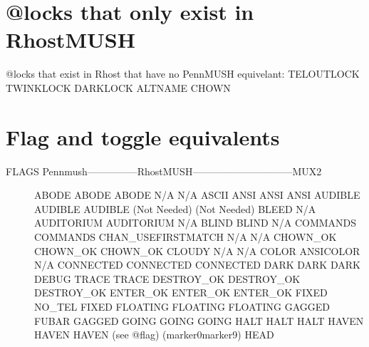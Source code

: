 \documentclass[letterpaper,10pt,english]{sphinxmanual}
\begin{document}
\section{@locks that only exist in RhostMUSH}
\label{\detokenize{31-comparison:locks-that-only-exist-in-rhostmush}}
\sphinxAtStartPar
@locks that exist in Rhost that have no PennMUSH equivelant:
TELOUTLOCK                   TWINKLOCK                     DARKLOCK
ALTNAME                      CHOWN


\section{Flag and toggle equivalents}
\label{\detokenize{31-comparison:flag-and-toggle-equivalents}}\begin{description}
\item[{FLAGS Pennmush—————\sphinxhyphen{}RhostMUSH——————————MUX2}] \leavevmode
\sphinxAtStartPar
ABODE                   ABODE                                  ABODE
N/A                     N/A                                    ASCII
ANSI                    ANSI                                   ANSI
AUDIBLE                 AUDIBLE                                AUDIBLE
(Not Needed)            (Not Needed)                           BLEED
N/A                     AUDITORIUM                             AUDITORIUM
N/A                     BLIND                                  BLIND
N/A                     COMMANDS                               COMMANDS
CHAN\_USEFIRSTMATCH      N/A                                    N/A
CHOWN\_OK                CHOWN\_OK                               CHOWN\_OK
CLOUDY                  N/A                                    N/A
COLOR                   ANSICOLOR                              N/A
CONNECTED               CONNECTED                              CONNECTED
DARK                    DARK                                   DARK
DEBUG                   TRACE                                  TRACE
DESTROY\_OK              DESTROY\_OK                             DESTROY\_OK
ENTER\_OK                ENTER\_OK                               ENTER\_OK
FIXED                   NO\_TEL                                 FIXED
FLOATING                FLOATING                               FLOATING
GAGGED                  FUBAR                                  GAGGED
GOING                   GOING                                  GOING
HALT                    HALT                                   HALT
HAVEN                   HAVEN                                  HAVEN
(see @flag)             (marker0\sphinxhyphen{}marker9)                      HEAD

\end{description}
\end{document}
